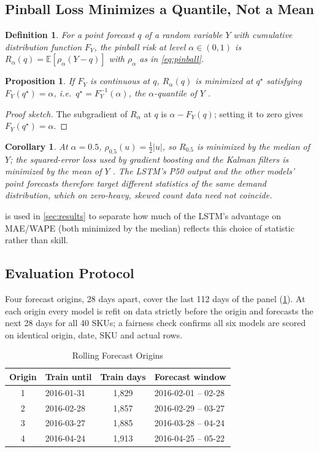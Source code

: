 \documentclass[conference]{IEEEtran}
\newtheorem{definition}{Definition}
\newtheorem{proposition}{Proposition}
\newtheorem{corollary}{Corollary}
\begin{document}
\subsection{Pinball Loss Minimizes a Quantile, Not a Mean}
\label{sec:prop}
\begin{definition}
For a point forecast $q$ of a random variable $Y$ with cumulative distribution function $F_Y$, the
\emph{pinball risk} at level $\alpha\in(0,1)$ is $R_\alpha(q)=\mathbb{E}[\rho_\alpha(Y-q)]$ with
$\rho_\alpha$ as in \cref{eq:pinball}.
\end{definition}
\begin{proposition}\label{prop:quantile}
If $F_Y$ is continuous at $q$, $R_\alpha(q)$ is minimized at $q^\star$ satisfying
$F_Y(q^\star)=\alpha$, i.e.\ $q^\star=F_Y^{-1}(\alpha)$, the $\alpha$-quantile of $Y$
\cite{koenker1978}.
\end{proposition}
\begin{proof}[Proof sketch]
The subgradient of $R_\alpha$ at $q$ is $\alpha-F_Y(q)$; setting it to zero gives
$F_Y(q^\star)=\alpha$.
\end{proof}
\begin{corollary}\label{cor:median}
At $\alpha=0.5$, $\rho_{0.5}(u)=\tfrac12|u|$, so $R_{0.5}$ is minimized by the \emph{median} of $Y$;
the squared-error loss used by gradient boosting and the Kalman filters is minimized by the
\emph{mean} of $Y$ \cite{kolassa2020}. The LSTM's P50 output and the other models' point forecasts
therefore target different statistics of the same demand distribution, which on zero-heavy, skewed
count data need not coincide.
\end{corollary}
 is used in \cref{sec:results} to separate how much of the LSTM's advantage on
MAE/WAPE (both minimized by the median) reflects this choice of statistic rather than skill.

\subsection{Evaluation Protocol}
Four forecast origins, 28 days apart, cover the last 112 days of the panel (\cref{tab:origins}). At
each origin every model is refit on data strictly before the origin and forecasts the next 28 days
for all 40 SKUs; a fairness check confirms all six models are scored on identical origin, date, SKU
and actual rows.

\begin{table}[t]
\centering
\caption{Rolling Forecast Origins}
\label{tab:origins}
\footnotesize
\begin{tabular}{@{}c l c l@{}}
\toprule
Origin & Train until & Train days & Forecast window \\
\midrule
1 & 2016-01-31 & 1{,}829 & 2016-02-01 -- 02-28 \\
2 & 2016-02-28 & 1{,}857 & 2016-02-29 -- 03-27 \\
3 & 2016-03-27 & 1{,}885 & 2016-03-28 -- 04-24 \\
4 & 2016-04-24 & 1{,}913 & 2016-04-25 -- 05-22 \\
\bottomrule
\end{tabular}
\end{table}
\end{document}
